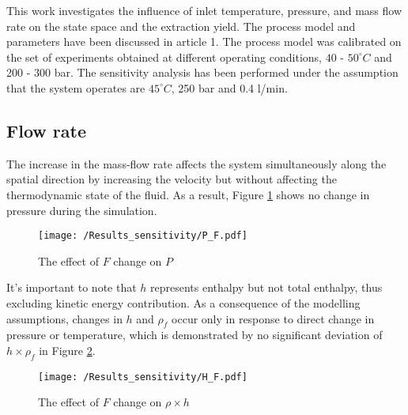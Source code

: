 \documentclass[../Article_Model_Parameters.tex]{subfiles}
\begin{document}
	
	\label{CH: Results}
	
	This work investigates the influence of inlet temperature, pressure, and mass flow rate on the state space and the extraction yield. The process model and parameters have been discussed in {\color{red}article 1}. The process model was calibrated on the set of experiments obtained at different operating conditions, $40$ - $50^\circ C$ and 200 - 300 bar. The sensitivity analysis has been performed under the assumption that the system operates are $45^\circ C$, 250 bar and 0.4 l/min. 
	
	\subsection{Flow rate}
	
	The increase in the mass-flow rate affects the system simultaneously along the spatial direction by increasing the velocity but without affecting the thermodynamic state of the fluid. As a result, Figure \ref{fig:Sensitivty_F_P} shows no change in pressure during the simulation. 
    
    \begin{figure}[h!]
    	\centering
    	\texttt{[image: /Results\_sensitivity/P\_F.pdf]}
    	\caption{The effect of $F$ change on $P$}
    	\label{fig:Sensitivty_F_P}
    \end{figure}
    
    It's important to note that $h$ represents enthalpy but not total enthalpy, thus excluding kinetic energy contribution. As a consequence of the modelling assumptions, changes in $h$ and $\rho_f$ occur only in response to direct change in pressure or temperature, which is demonstrated by no significant deviation of $h \times \rho_f$ in Figure \ref{fig:Sensitivty_F_H}.
    
        
    \begin{figure}[h!]
    	\centering
    	\texttt{[image: /Results\_sensitivity/H\_F.pdf]}
    	\caption{The effect of $F$ change on $\rho \times h$}
    	\label{fig:Sensitivty_F_H}
    \end{figure}
   
\end{document}
